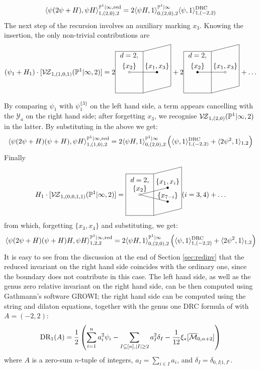 \begin{ex}
\[\langle \psi(2\psi +H),\psi H\rangle^{\mathbb P^1|\infty,\rm{red}}_{1,(2,0),2}=2\langle \psi H,1\rangle^{\mathbb P^1|\infty}_{0,(2,0),2}\langle\psi,1\rangle^{\rm{DRC}}_{1,(-2,2)}\]
The next step of the recursion involves an auxiliary marking $x_3$. Knowing the insertion, the only non-trivial contributions are
 \begin{multline*} (\psi_1+H_1)\cdot [\VZ{(1,0,1)}{\PP^1|\infty}{2}]= 2{\tikz[baseline=-3pt,scale=.7]{
\draw (2,0) node[above]{$\{x_1,x_3\}$} -- (0,0)node[above,align=center]{$d=2$,\\$\{x_2\}$};
\draw (2,0) circle(2pt)[fill=black];
\draw (0,0) circle(2pt)[fill=white];
\draw (-1,1.5) -- (1,1.5) -- (1,-1.5) -- (-1,-1.5) -- (-1,1.5);
\draw (1,1.5) -- (3,2) -- (3,-1) -- (1,-1.5);
}}+
2{\tikz[baseline=-3pt,scale=.7]{
\draw (2,0) node[above]{$\{x_1,x_3\}$} -- (0,0)node[above,align=center]{$d=2$,\\ $\{x_2\}$};
\draw (2,0) circle(2pt)[fill=white];
\draw (0,0) circle(2pt)[fill=black];
\draw (-1,1.5) -- (1,1.5) -- (1,-1.5) -- (-1,-1.5) -- (-1,1.5);
\draw (1,1.5) -- (3,2) -- (3,-1) -- (1,-1.5);
}}+\ldots
\end{multline*}

By comparing $\psi_1$ with $\psi_1^{\{3\}}$ on the left hand side, a term appears cancelling with the $\mathcal Y_a$ on the right hand side; after forgetting $x_3$, we recognise $\mathcal{V\!Z}_{1,(2,0)}(\mathbb P^1|\infty,2)$ in the latter. By substituting in the above we get:
\[\langle \psi(2\psi +H)(\psi+H),\psi H\rangle^{\mathbb P^1|\infty,\rm{red}}_{1,(1,0),2}=2\langle \psi H,1\rangle^{\mathbb P^1|\infty}_{0,(2,0),2}\left(\langle\psi,1\rangle^{\rm{DRC}}_{1,(-2,2)}+\langle2\psi^2,1\rangle_{1,2}\right)\]
Finally
\[H_1\cdot[\VZ{(0,0,1,1)}{\PP^1|\infty}{2}]={\tikz[baseline=-3pt,scale=.7]{
\draw (2,.5) node[above]{$\{x_1,x_i\}$} -- (0,0)node[above,align=center]{$d=2$,\\$\{x_2\}$}  (2,-.5)node[above]{$\{x_{7-i}\}$} -- (0,0);
\draw (2,.5) circle(2pt)[fill=black];
\draw (2,-.5) circle(2pt)[fill=black];
\draw (0,0) circle(2pt)[fill=white];
\draw (-1,1.5) -- (1,1.5) -- (1,-1.5) -- (-1,-1.5) -- (-1,1.5);
\draw (1,1.5) -- (3,2) -- (3,-1) -- (1,-1.5);
}} (i=3,4) +\ldots\]
from which, forgetting $\{x_3,x_4\}$ and substituting, we get:
\[\langle \psi(2\psi +H)(\psi+H)H,\psi H\rangle^{\mathbb P^1|\infty,\rm{red}}_{1,2,2}=2\langle \psi H,1\rangle^{\mathbb P^1|\infty}_{0,(2,0),2}\left(\langle\psi,1\rangle^{\rm{DRC}}_{1,(-2,2)}+\langle2\psi^2,1\rangle_{1,2}\right)\]
It is easy to see from the discussion at the end of Section \ref{sec:redinv} that the reduced invariant on the right hand side coincides with the ordinary one, since the boundary does not contribute in this case. The left hand side, as well as the genus zero relative invariant on the right hand side, can be then computed using Gathmann's software GROWI; the right hand side can be computed using the string and dilaton equations, together with the genus one DRC formula of \cite[\S 0.5.2]{JPPZ} with $A=(-2,2)$:
\[\operatorname{DR}_1(A)=\frac{1}{2}\left(\sum_{i=1}^n a_i^2\psi_i-\sum_{I\subseteq [n],\lvert I\rvert\geq2}a_I^2\delta_I-\frac{1}{12}\xi_*[\overline{\mathcal{M}}_{0,n+2}]\right)\]
where $A$ is a zero-sum $n$-tuple of integers, $a_I=\sum_{i\in I}a_i$, and $\delta_I=\delta_{0,I|1,I^c}$.
\end{ex}


